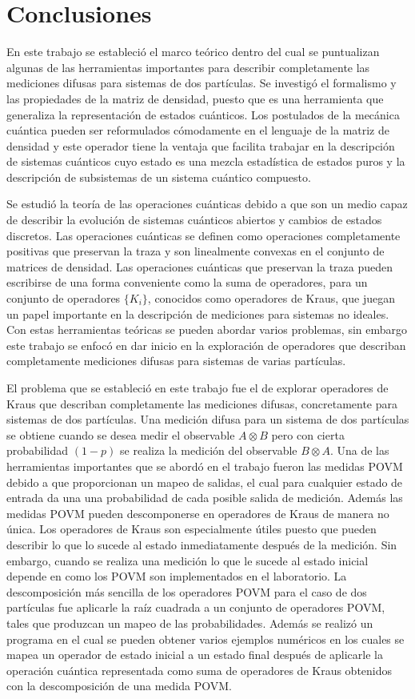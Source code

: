 \chapter{Conclusiones }

En este trabajo se estableció el marco teórico dentro del cual se puntualizan algunas de las herramientas importantes para describir completamente las mediciones difusas para sistemas de dos partículas. Se investigó el formalismo y las propiedades de la matriz de densidad, puesto que es una herramienta que generaliza la representación de estados cuánticos. Los postulados de la mecánica cuántica pueden ser reformulados cómodamente en el lenguaje de la matriz de densidad y este operador tiene la ventaja que facilita trabajar en la descripción de sistemas cuánticos cuyo estado es una mezcla estadística de estados puros y la descripción de subsistemas de un sistema cuántico compuesto. 

Se estudió la teoría de las operaciones cuánticas debido a que son un medio capaz de describir la evolución de sistemas cuánticos abiertos y cambios de estados discretos. Las operaciones cuánticas se definen como operaciones completamente positivas que preservan la traza y son linealmente convexas en el conjunto de matrices de densidad. Las operaciones cuánticas que preservan la traza pueden escribirse de una forma conveniente como la suma de operadores, para un conjunto de operadores $\{K_i\}$, conocidos como operadores de Kraus, que juegan un papel importante en la descripción de mediciones para sistemas no ideales. Con estas herramientas teóricas se pueden abordar varios problemas, sin embargo este trabajo se enfocó en dar inicio en la exploración de operadores que describan completamente mediciones difusas para sistemas de varias partículas. 


El problema que se estableció en este trabajo fue el de explorar operadores de Kraus que describan completamente las mediciones difusas, concretamente para sistemas de dos partículas. Una medición difusa para un sistema de dos partículas se obtiene cuando se desea medir el observable $A\otimes B$ pero con cierta probabilidad $(1-p)$ se realiza la medición del observable $B\otimes A $. Una de las herramientas importantes que se abordó en el trabajo fueron las medidas POVM debido a que proporcionan un mapeo de salidas, el cual para cualquier estado de entrada da una una probabilidad de cada posible salida de medición. Además las medidas POVM pueden descomponerse en operadores de Kraus de manera no única. Los operadores de Kraus son especialmente útiles puesto que pueden describir lo que lo sucede al estado inmediatamente después de la medición. Sin embargo, cuando se realiza una medición lo que le sucede al estado inicial depende en como los POVM son implementados en el laboratorio. La descomposición más sencilla de los operadores POVM para el caso de dos partículas fue aplicarle la raíz cuadrada a un conjunto de operadores POVM, tales que produzcan un mapeo de las probabilidades. Además se realizó un programa en el cual se pueden obtener varios ejemplos numéricos en los cuales se mapea un operador de estado inicial a un estado final después de aplicarle la operación cuántica representada como suma de operadores de Kraus obtenidos con la descomposición de una medida POVM\@.


